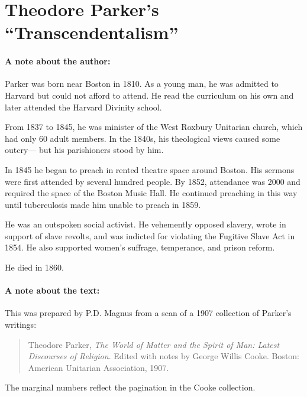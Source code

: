 \documentclass[12pt]{article}
\begin{document}

\section*{Theodore Parker's ``Transcendentalism''}



\paragraph{A note about the author:}
Parker was born near Boston in 1810. As a young man, he was admitted to Harvard but could not afford to attend. He read the curriculum on his own and later attended the Harvard Divinity school.

From 1837 to 1845, he was minister of the West Roxbury Unitarian church, which had only 60 adult members. In the 1840s, his theological views caused some outcry--- but his parishioners stood by him.

In 1845 he began to preach in rented theatre space around Boston. His sermons were first attended by several hundred people. By 1852, attendance was 2000 and required the space of the Boston Music Hall. He continued preaching in this way until tuberculosis made him unable to preach in 1859.

He was an outspoken social activist. He vehemently opposed slavery, wrote in support of slave revolts, and was indicted for violating the Fugitive Slave Act in 1854. He also supported women's suffrage, temperance, and prison reform.


He died in 1860.




\paragraph{A note about the text:}
This was prepared by P.D. Magnus from a scan of a 1907 collection of Parker's writings:
\begin{quote}
Theodore Parker, \emph{The World of Matter and the Spirit of Man: Latest Discourses of Religion}. Edited with notes by George Willis Cooke. Boston: American Unitarian Association, 1907.
\end{quote}
The marginal numbers reflect the pagination in the Cooke collection.
\end{document}
